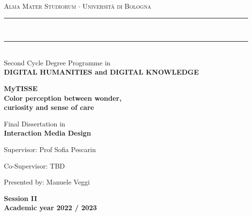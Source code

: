 \documentclass[12pt,a4paper]{article}
\begin{document}
\begin{titlepage}
\begin{center}
{{\Large{\textsc{Alma Mater Studiorum $\cdot$ Universit\`a di
Bologna}}}} 
\rule[0.1cm]{15.8cm}{0.1mm} \\
\rule[0.5cm]{15.8cm}{0.6mm} \\
Second Cycle Degree Programme in\\{\bf DIGITAL HUMANITIES and DIGITAL KNOWLEDGE}
\end{center}
\vspace{45mm}
\begin{center}
{\LARGE{\bf MyTISSE}}\\
\vspace{3mm}
{\LARGE{\bf Color perception between wonder,}}\\
\vspace{3mm}
{\LARGE{\bf curiosity and sense of care}}\\
\end{center}
\vspace{25mm}
\begin{center}
Final Dissertation in\\{\bf Interaction Media Design}
\end{center}
\vspace{15mm}
\par
{\noindent
Supervisor: Prof Sofia Pescarin
\vspace{3mm}
\par
\noindent
Co-Supervisor: TBD
\vspace{3mm}
\par
\noindent
Presented by: Manuele Veggi
}
\vspace{20mm}
\begin{center}
{\bf Session II\\
\vspace{2mm}
Academic year 2022 / 2023}
\end{center}
\end{titlepage}
\end{document}
